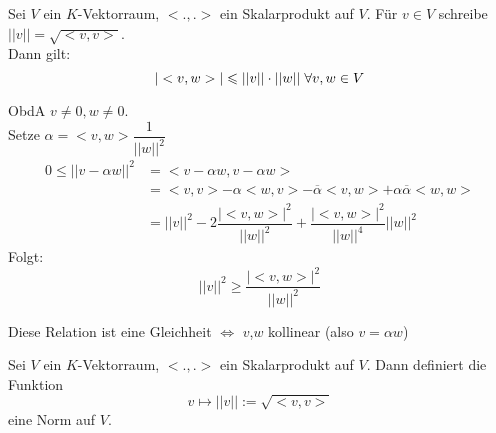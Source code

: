 \documentclass[main.tex]{subfiles}
\begin{document}
\begin{Theorem}
  Sei $V$ ein $K$-Vektorraum, $<.,.>$ ein Skalarprodukt auf $V$. Für $v \in V$ schreibe $||v|| = \sqrt{<v,v>}$.\\
  Dann gilt:
  $$|<v,w>| \leqslant ||v||\cdot ||w|| \;\forall v,w \in V$$
\end{Theorem}

\begin{Beweis}
  ObdA $v \neq 0, w \neq 0$.\\
  Setze $\alpha = <v,w> \dfrac{1}{||w||^2}$
  $$\begin{aligned}
    0 \leq ||v - \alpha w||^2 &= <v-\alpha w, v-\alpha w>\\
    &= <v,v> - \alpha <w,v> - \overline{\alpha}<v,w>+ \alpha \overline{\alpha}<w,w>\\
    &= ||v||^2 - 2 \dfrac{|<v,w>|^2}{||w||^2} + \dfrac{|<v,w>|^2}{||w||^4} ||w||^2
  \end{aligned}$$
  Folgt:
  $$||v||^2 \geq \dfrac{|<v,w>|^2}{||w||^2}$$
\end{Beweis}

\begin{Bemerkung}
  Diese Relation ist eine Gleichheit $\Leftrightarrow$ $v$,$w$ kollinear (also $v = \alpha w $)
\end{Bemerkung}

\begin{Theorem}
  Sei $V$ ein $K$-Vektorraum, $<.,.>$ ein Skalarprodukt auf $V$. Dann definiert die Funktion
  $$v \mapsto ||v|| := \sqrt{<v,v>}$$
  eine Norm auf $V$.
\end{Theorem}
\end{document}

